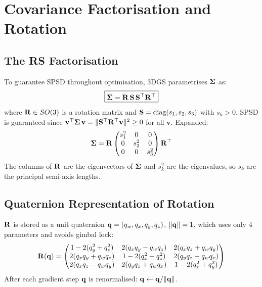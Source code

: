 \newpage
\section{Covariance Factorisation and Rotation}
\label{sec:covariance}

\subsection{The RS Factorisation}

To guarantee SPSD throughout optimisation, 3DGS parametrises $\boldsymbol{\Sigma}$ as:
\begin{equation}
  \boxed{
    \boldsymbol{\Sigma} = \mathbf{R}\,\mathbf{S}\,\mathbf{S}^\top\mathbf{R}^\top
  }
  \label{eq:cov_factorization}
\end{equation}
where $\mathbf{R} \in SO(3)$ is a rotation matrix and
$\mathbf{S} = \operatorname{diag}(s_1, s_2, s_3)$ with $s_k > 0$.
SPSD is guaranteed since $\mathbf{v}^\top\boldsymbol{\Sigma}\,\mathbf{v} =
\|\mathbf{S}^\top\mathbf{R}^\top\mathbf{v}\|^2 \geq 0$ for all $\mathbf{v}$.
Expanded:
\begin{equation}
  \boldsymbol{\Sigma} = \mathbf{R}
  \begin{pmatrix} s_1^2 & 0 & 0 \\ 0 & s_2^2 & 0 \\ 0 & 0 & s_3^2 \end{pmatrix}
  \mathbf{R}^\top
\end{equation}
The columns of $\mathbf{R}$ are the eigenvectors of $\boldsymbol{\Sigma}$ and $s_k^2$ are the
eigenvalues, so $s_k$ are the principal semi-axis lengths.

\subsection{Quaternion Representation of Rotation}
\label{ssec:quaternion}

$\mathbf{R}$ is stored as a unit quaternion $\mathbf{q} = (q_w, q_x, q_y, q_z)$,
$\|\mathbf{q}\|=1$, which uses only 4 parameters and avoids gimbal lock:
\begin{equation}
  \mathbf{R}(\mathbf{q}) =
  \begin{pmatrix}
    1 - 2(q_y^2 + q_z^2) & 2(q_xq_y - q_wq_z)  & 2(q_xq_z + q_wq_y) \\
    2(q_xq_y + q_wq_z)   & 1 - 2(q_x^2 + q_z^2) & 2(q_yq_z - q_wq_x) \\
    2(q_xq_z - q_wq_y)   & 2(q_yq_z + q_wq_x)   & 1 - 2(q_x^2 + q_y^2)
  \end{pmatrix}
\end{equation}
After each gradient step $\mathbf{q}$ is renormalised: $\mathbf{q} \leftarrow \mathbf{q}/\|\mathbf{q}\|$.

\newpage